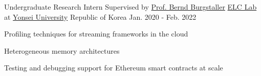 

\begin{cventries}

  \cventry
    {Undergraduate Research Intern Supervised by \href{https://cs.yonsei.ac.kr/bbs/board.php?bo_table=sub2_1_a&wr_id=18}{Prof. Bernd Burgstaller}} %
    {\href{https://elc.yonsei.ac.kr}{ELC Lab} at \href{https://www.yonsei.ac.kr/sc/index.jsp}{Yonsei University}} %
    {Republic of Korea} %
    {Jan. 2020 - Feb. 2022} %
    {
      \begin{cvitems} %
        \item {Profiling techniques for streaming frameworks in the cloud}
        \item {Heterogeneous memory architectures}
        \item {Testing and debugging support for Ethereum smart contracts at scale}
      \end{cvitems}
    }

\end{cventries}
